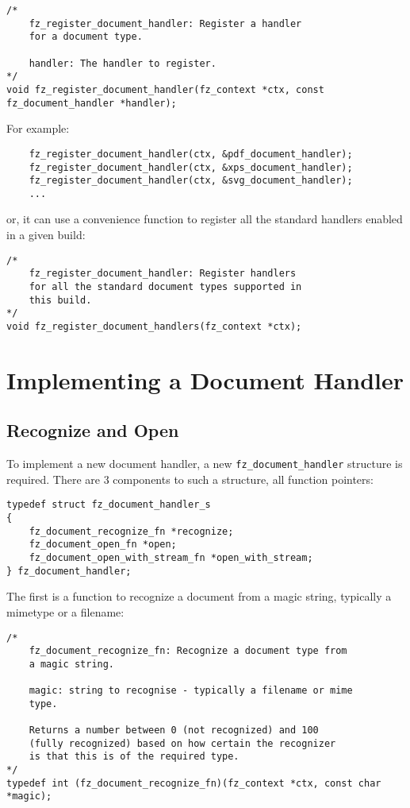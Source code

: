 \documentclass[oneside]{book}
\begin{document}
\begin{lstlisting}
/*
	fz_register_document_handler: Register a handler
	for a document type.

	handler: The handler to register.
*/
void fz_register_document_handler(fz_context *ctx, const fz_document_handler *handler);
\end{lstlisting}

For example:

\begin{lstlisting}
	fz_register_document_handler(ctx, &pdf_document_handler);
	fz_register_document_handler(ctx, &xps_document_handler);
	fz_register_document_handler(ctx, &svg_document_handler);
	...
\end{lstlisting}

or, it can use a convenience function to register all the standard handlers enabled in a given build:

\begin{lstlisting}
/*
	fz_register_document_handler: Register handlers
	for all the standard document types supported in
	this build.
*/
void fz_register_document_handlers(fz_context *ctx);
\end{lstlisting}

\section{Implementing a Document Handler}

\subsection{Recognize and Open}

To implement a new document handler, a new \texttt{fz\_document\_handler} structure is required. There are 3 components to such a structure, all function pointers:

\begin{lstlisting}
typedef struct fz_document_handler_s
{
	fz_document_recognize_fn *recognize;
	fz_document_open_fn *open;
	fz_document_open_with_stream_fn *open_with_stream;
} fz_document_handler;
\end{lstlisting}

The first is a function to recognize a document from a magic string, typically a mimetype or a filename:

\begin{lstlisting}
/*
	fz_document_recognize_fn: Recognize a document type from
	a magic string.

	magic: string to recognise - typically a filename or mime
	type.

	Returns a number between 0 (not recognized) and 100
	(fully recognized) based on how certain the recognizer
	is that this is of the required type.
*/
typedef int (fz_document_recognize_fn)(fz_context *ctx, const char *magic);
\end{lstlisting}
\end{document}

